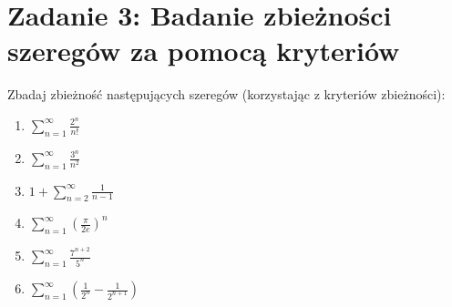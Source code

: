 \section{Zadanie 3: Badanie zbieżności szeregów za pomocą kryteriów}
\label{sec:zadanie3}

\begin{tresczadania}
Zbadaj zbieżność następujących szeregów (korzystając z kryteriów zbieżności):
\begin{enumerate}[label=(\alph*),leftmargin=2em]
    \item $\displaystyle \sum_{n=1}^{\infty} \frac{2^n}{n!}$
    \item $\displaystyle \sum_{n=1}^{\infty} \frac{3^n}{n^2}$
    \item $\displaystyle 1 + \sum_{n=2}^{\infty} \frac{1}{n-1}$
    \item $\displaystyle \sum_{n=1}^{\infty} \left(\frac{\pi}{2e}\right)^n$
    \item $\displaystyle \sum_{n=1}^{\infty} \frac{7^{n+2}}{5^n}$
    \item $\displaystyle \sum_{n=1}^{\infty} \left(\frac{1}{2^n} - \frac{1}{2^{n+1}}\right)$
\end{enumerate}
\end{tresczadania}

\vspace{0.2cm}

